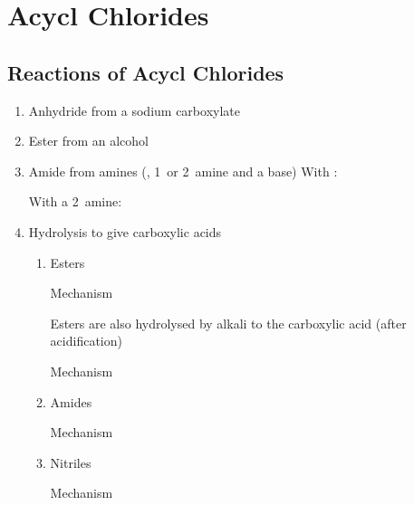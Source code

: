 \section{Acycl Chlorides}

\subsection{Reactions of Acycl Chlorides}

\begin{enumerate}[label=\alph*)]

  \item Anhydride from a sodium carboxylate

  \item Ester from an alcohol

  \item Amide from amines (, 1\de\ or 2\de\ amine and a base)
    With :

    With a 2\de\ amine:

  \item Hydrolysis to give carboxylic acids

    \begin{enumerate}[label=\roman*)]

      \item Esters


        Mechanism


        Esters are also hydrolysed by alkali to the carboxylic acid (after
        acidification)


        Mechanism


      \item Amides


        Mechanism


      \item Nitriles


        Mechanism


    \end{enumerate}

\end{enumerate}